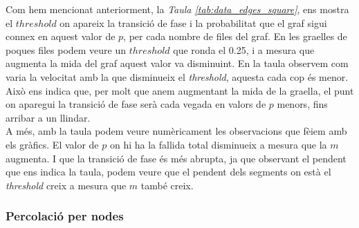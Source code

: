\documentclass[a4paper]{article}
\begin{document}
	Com hem mencionat anteriorment, la \textit{Taula \ref{tab:data_edges_square}}, ens mostra el $threshold$ on apareix la transició de fase i la probabilitat que el graf sigui connex en aquest valor de $p$, per cada nombre de files del graf. En les graelles de poques files podem veure un $threshold$ que ronda el 0.25, i a mesura que augmenta la mida del graf aquest valor va disminuint. En la taula observem com varia la velocitat amb la que disminueix el \textit{threshold}, aquesta cada cop és menor. Això ens indica que, per molt que anem augmentant la mida de la graella, el punt on aparegui la transició de fase serà cada vegada en valors de $p$ menors, fins arribar a un llindar. \\
	
	A més, amb la taula podem veure numèricament les observacions que fèiem amb els gràfics. El valor de $p$ on hi ha la fallida total disminueix a mesura que la $m$ augmenta. I que la transició de fase és més abrupta, ja que observant el pendent que ens indica la taula, podem veure que el pendent dels segments on està el \textit{threshold} creix a mesura que $m$ també creix.
	
	\subsubsection{Percolació per nodes}
	
\end{document}
